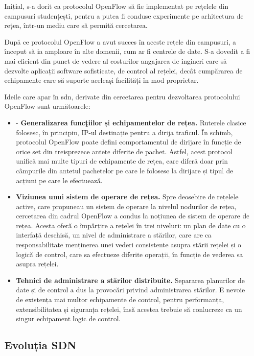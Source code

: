 Inițial, s-a dorit ca protocolul OpenFlow să fie implementat pe rețelele din campusuri studențești, pentru a putea fi conduse experimente pe arhitectura de rețea, într-un mediu care să permită cercetarea.

După ce protocolul OpenFlow a avut succes în aceste rețele din campusuri, a început să ia amploare în alte domenii, cum ar fi centrele de date. S-a dovedit a fi mai eficient din punct de vedere al costurilor angajarea de ingineri care să dezvolte aplicații software sofisticate, de control al rețelei, decât cumpărarea de echipamente care să suporte aceleași facilități în mod proprietar.

Ideile care apar în \gls{sdn}, derivate din cercetarea pentru dezvoltarea protocolului OpenFlow sunt următoarele:
\begin{itemize}
	\item -	\textbf{Generalizarea funcţiilor și echipamentelor de rețea.} Ruterele clasice folosesc, în principiu, IP-ul destinație pentru a dirija traficul. În schimb, protocolul OpenFlow poate defini comportamentul de dirijare în funcție de orice set din treisprezece antete diferite de pachet. Astfel, acest protocol unifică mai multe tipuri de echipamente de rețea, care diferă doar prin câmpurile din antetul pachetelor pe care le folosesc la dirijare și tipul de acțiuni pe care le efectuează.
	\item \textbf{Viziunea unui sistem de operare de rețea.} Spre deosebire de rețelele active, care propuneau un sistem de operare la nivelul nodurilor de rețea, cercetarea din cadrul OpenFlow a condus la noțiunea de sistem de operare de rețea. Acesta oferă o împărțire a rețelei în trei niveluri: un plan de date cu o interfață deschisă, un nivel de administrare a stărilor, care are ca responsabilitate menținerea unei vederi consistente asupra stării rețelei și o logică de control, care sa efectueze diferite operații, în funcție de vederea sa asupra rețelei.
	\item \textbf{Tehnici de administrare a stărilor distribuite.} Separarea planurilor de date și de control a dus la provocări privind administrarea stărilor. E nevoie de existența mai multor echipamente de control, pentru performanța, extensibilitatea și siguranța rețelei, însă acestea trebuie să conlucreze ca un singur echipament logic de control.
\end{itemize}


\subsection{Evoluția SDN}

